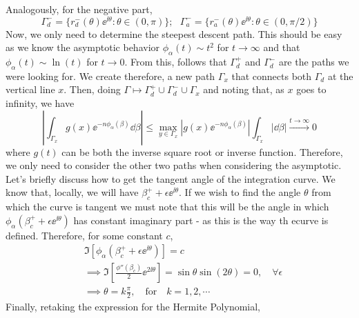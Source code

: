 Analogously, for the negative part,
\begin{equation}
	\Gamma_d^- = \{ r_d^-(\theta) \ee^{\ii \theta} : \theta \in (0, \pi) \}; \ \ \ \Gamma_a^- = \{ r_a^-(\theta) \ee^{\ii \theta} : \theta \in (0, \pi/2) \}
\end{equation}
Now, we only need to determine the steepest descent path. This should be easy as we know the asymptotic behavior $\phi_\alpha(t) \sim t^2$ for $t \rightarrow \infty$ and that  $\phi_{\alpha}(t) \sim \ln{(t)}$ for $t \rightarrow 0$. From this, follows that $\Gamma_d^+$ and $\Gamma_d^-$ are the paths we were looking for.  We create therefore, a new path $\Gamma_x$ that connects both $\Gamma_d$ at the vertical line $x$. Then, doing $\Gamma \mapsto \Gamma_d^+ \cup \Gamma_d^- \cup \Gamma_x$ and noting that, as $x$ goes to infinity, we have
\begin{equation}
	\left|  \int_{\Gamma_x} g(x) \ee^{-n\phi_\alpha(\beta)} \dd \beta  \right| \leq \max_{y \in \Gamma_x}{\left|  g(x) \ee^{-n\phi_\alpha(\beta)} \right|} \int_{\Gamma_x} |\dd \beta| \stackrel{t \rightarrow \infty}{\rightarrow} 0
\end{equation} 
where $g(t)$ can be both the inverse square root or inverse function. Therefore, we only need to consider the other two paths when considering the asymptotic. Let's briefly discuss how to get the tangent angle of the integration curve.  We know that, locally, we will have $\beta_c^+ + \epsilon \ee^{\ii \theta}$. If we wish to find the angle $\theta$ from which the curve is tangent we must note that this will be the angle in which $\phi_\alpha(\beta_c^+ + \epsilon \ee^{\ii \theta})$ has constant imaginary part - as this is the way th ecurve is defined. Therefore, for some constant $c$,
\begin{align}
	& \Im{\left[ \phi_\alpha(\beta_c^+ + \epsilon \ee^{\ii \theta})\right]} = c \\
	& \implies \Im{\left[ \frac{\phi''(\beta_c)}{2} \ee^{2 \ii \theta}   \right]} =  \sin{\theta} \sin{(2\theta)} = 0, \quad \forall \epsilon \\
	& \implies \theta = k \frac{\pi}{2}, \quad \text{for} \quad k = 1,2,\cdots
\end{align}
Finally, retaking the expression for the Hermite Polynomial,
